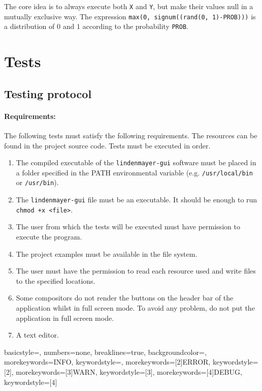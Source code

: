 \documentclass[a4paper]{article}
\begin{document}
The core idea is to always execute both \texttt{X} and \texttt{Y}, but make their values null in a mutually exclusive way.
The expression \texttt{max(0, signum((rand(0, 1)-PROB)))} is a distribution of \(0\) and \(1\) according
to the probability \texttt{PROB}.

\pagebreak

\section{Tests}

\subsection{Testing protocol}

\paragraph{Requirements:}
The following tests must satisfy the following requirements.
The resources can be found in the project source code.
Tests must be executed in order.

\begin{enumerate}
    \item The compiled executable of the \texttt{lindenmayer-gui} software
    must be placed in a folder specified in the \textsc{PATH}
    environmental variable (e.g. \texttt{/usr/local/bin} or \texttt{/usr/bin}).
    \item The \texttt{lindenmayer-gui} file must be an executable. It should be enough to run
    \lstinline{chmod +x <file>}.
    \item The user from which the tests will be executed must have permission to execute
    the program.
    \item The project examples must be available in the file system.
    \item The user must have the permission to read each resource used and write files
    to the specified locations.
    \item Some compositors do not render the buttons on the header bar of the application whilst in full screen mode.
    To avoid any problem, do not put the application in full screen mode.
    \item A text editor.
\end{enumerate}

 {
    basicstyle=\ttfamily,
    numbers=none,
    breaklines=true,
    backgroundcolor=\color[gray]{0.97},
    morekeywords={INFO},
    keywordstyle=\color[rgb]{0, 0.75, 0},
    morekeywords=[2]{ERROR},
    keywordstyle=[2]\color[rgb]{0.75, 0, 0},
    morekeywords=[3]{WARN},
    keywordstyle=[3]\color[rgb]{1, 0.5, 0},
    morekeywords=[4]{DEBUG},
    keywordstyle=[4]\color[rgb]{0.1, 0.1, 0.9}
}
\end{document}
